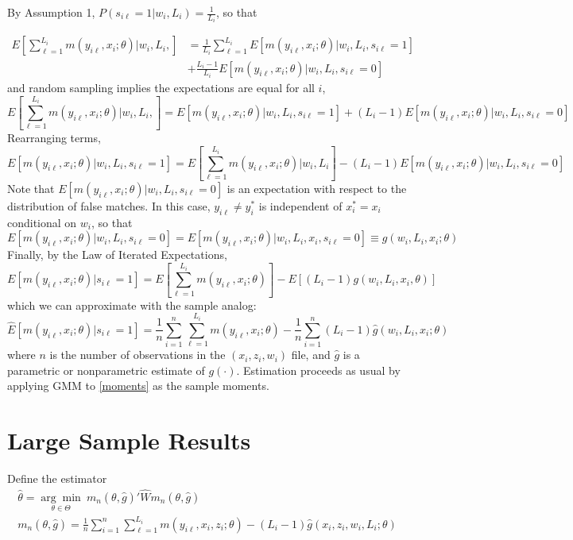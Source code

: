 \documentclass[12pt]{article}
\newcommand{\meanN}{\frac{1}{n}\sum_{i=1}^n}
\newcommand{\sumL}{\sum_{\ell=1}^{L_i}}
\newcommand{\meanL}{\frac{1}{L_i}\sumL}
\begin{document}
By Assumption 1, $P(s_{i\ell} = 1 | w_i, L_i) = \frac{1}{L_i}$, so that 

\begin{align*}  E\left[\sumL m\left(y_{i\ell}, x_i; \theta\right) \Bigg\vert w_i, L_i, \right]  &= \meanL E[m(y_{i\ell}, x_i; \theta) | w_i, L_i, s_{i\ell} = 1] \\&+ \frac{L_i-1}{L_i}E[m(y_{i\ell}, x_i; \theta) | w_i, L_i, s_{i\ell} = 0] \end{align*}
and random sampling implies the expectations are equal for all $i$, 
\begin{equation*}
   E\left[\sumL m\left(y_{i\ell}, x_i; \theta\right) \Bigg\vert w_i, L_i, \right] = E\left[m(y_{i\ell}, x_{i}; \theta) | w_i, L_i, s_{i\ell} = 1\right] + (L_i - 1)E\left[m(y_{i\ell}, x_i; \theta) | w_i, L_i, s_{i\ell} =0 \right] 
\end{equation*}
Rearranging terms, 
\begin{equation*} E[m(y_{i\ell}, x_i; \theta) | w_i, L_i, s_{i\ell}=1] = E\left[\sum_{\ell=1}^{L_i} m(y_{i\ell},x_i; \theta)\Bigg\vert w_i, L_i \right] - (L_i-1) E[m(y_{i\ell},x_i; \theta) | w_i, L_i, s_{i\ell} = 0] \end{equation*}
Note that $E[m(y_{i\ell}, x_i; \theta) | w_i, L_i, s_{i\ell} = 0]$ is an expectation with respect to the distribution of false matches.  In this case, $y_{i\ell} \neq y_i^*$ is independent of $x_i^* = x_i$ conditional on $w_i$, so that
$$ E[m(y_{i\ell}, x_i; \theta) | w_i, L_i, s_{i\ell} = 0] =  E[m(y_{i\ell}, x_i; \theta) | w_i, L_i, x_i, s_{i\ell} = 0] \equiv g(w_i, L_i, x_i; \theta)$$ 
Finally, by the Law of Iterated Expectations,
\begin{equation}
E[m(y_{i\ell}, x_i; \theta) | s_{i\ell}=1] = E\left[\sum_{\ell=1}^{L_i} m(y_{i\ell},x_i; \theta)\right] -  E[(L_i -1)g(w_i,L_i,x_i, \theta)]
\end{equation}
which we can approximate with the sample analog:
\begin{equation} \hat{E}\left[m(y_{i\ell}, x_i; \theta) | s_{i\ell} =1\right] = \meanN \sumL m(y_{i\ell}, x_i; \theta) -  \meanN(L_i - 1) \hat{g}(w_i, L_i, x_i; \theta) \label{moments} \end{equation} 
where $n$ is the number of observations in the $(x_i, z_i, w_i)$ file, and $\hat{g}$ is a parametric or nonparametric estimate of $g(\cdot).$  
Estimation proceeds as usual by applying GMM to \ref{moments} as the sample moments.    


\section{Large Sample Results}
Define the estimator 
\begin{gather} \hat{\theta} =  \underset{\theta \in \Theta}{\arg\min}\ m_n(\theta, \hat{g})'\hat{W}m_n(\theta,\hat{g}) \\
m_n(\theta,\hat{g}) = \meanN \sum_{\ell=1}^{L_i} m(y_{i\ell}, x_i, z_i; \theta) - (L_i -1) \hat{g}(x_i, z_i, w_i, L_i; \theta) 
\end{gather}
\end{document}
